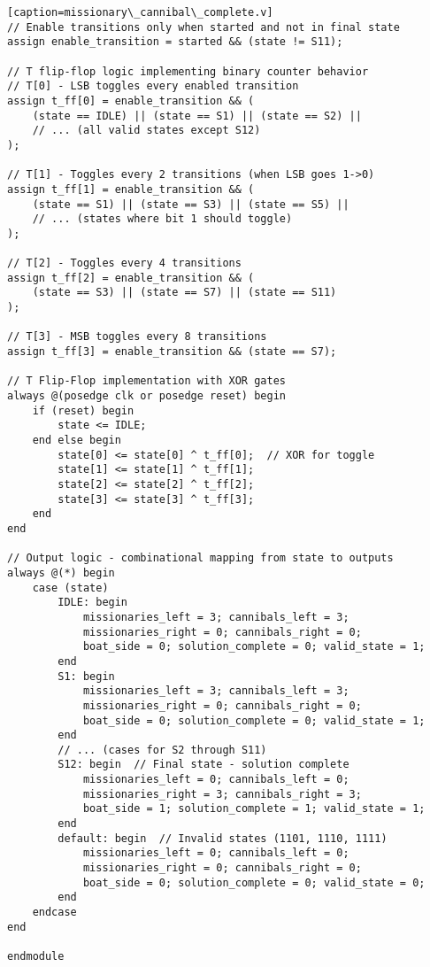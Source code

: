 \documentclass[10pt,a4paper]{article}
\begin{document}
\begin{lstlisting}[style=verilog][caption=missionary\_cannibal\_complete.v]
// Enable transitions only when started and not in final state
assign enable_transition = started && (state != S11);

// T flip-flop logic implementing binary counter behavior
// T[0] - LSB toggles every enabled transition
assign t_ff[0] = enable_transition && (
    (state == IDLE) || (state == S1) || (state == S2) ||
    // ... (all valid states except S12)
);

// T[1] - Toggles every 2 transitions (when LSB goes 1->0)
assign t_ff[1] = enable_transition && (
    (state == S1) || (state == S3) || (state == S5) ||
    // ... (states where bit 1 should toggle)
);

// T[2] - Toggles every 4 transitions
assign t_ff[2] = enable_transition && (
    (state == S3) || (state == S7) || (state == S11)
);

// T[3] - MSB toggles every 8 transitions
assign t_ff[3] = enable_transition && (state == S7);

// T Flip-Flop implementation with XOR gates
always @(posedge clk or posedge reset) begin
    if (reset) begin
        state <= IDLE;
    end else begin
        state[0] <= state[0] ^ t_ff[0];  // XOR for toggle
        state[1] <= state[1] ^ t_ff[1];
        state[2] <= state[2] ^ t_ff[2];
        state[3] <= state[3] ^ t_ff[3];
    end
end

// Output logic - combinational mapping from state to outputs
always @(*) begin
    case (state)
        IDLE: begin
            missionaries_left = 3; cannibals_left = 3;
            missionaries_right = 0; cannibals_right = 0;
            boat_side = 0; solution_complete = 0; valid_state = 1;
        end
        S1: begin
            missionaries_left = 3; cannibals_left = 3;
            missionaries_right = 0; cannibals_right = 0;
            boat_side = 0; solution_complete = 0; valid_state = 1;
        end
        // ... (cases for S2 through S11)
        S12: begin  // Final state - solution complete
            missionaries_left = 0; cannibals_left = 0;
            missionaries_right = 3; cannibals_right = 3;
            boat_side = 1; solution_complete = 1; valid_state = 1;
        end
        default: begin  // Invalid states (1101, 1110, 1111)
            missionaries_left = 0; cannibals_left = 0;
            missionaries_right = 0; cannibals_right = 0;
            boat_side = 0; solution_complete = 0; valid_state = 0;
        end
    endcase
end

endmodule
\end{lstlisting}
\end{document}
